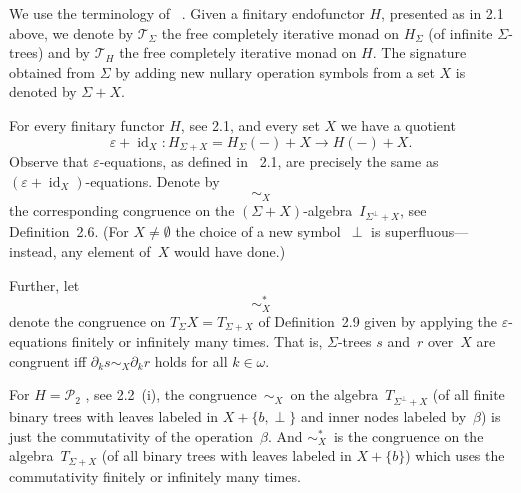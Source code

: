 \documentclass{entcs}
\newcommand{\simx}{\ensuremath{\mathrel{\sim_X}}}
\newcommand{\simxs}{\ensuremath{\mathrel{\sim_X^*}}}
\newcommand{\PP}{\ensuremath{\mathscr{P}}}
\newcommand{\TT}{\ensuremath{\mathscr{T}}}
\DeclareMathOperator{\id}{id}
\newenvironment{pv}[1]{\begin{trivlist}
\item[\hspace{\labelsep}\normalfont\bfseries#1]}%
{\end{trivlist}}
\begin{document}
\begin{pv}{3.1}
We use the terminology of ~\cite{aamv}. Given a finitary endofunctor $H$,
presented as in 2.1 above, we denote by $\TT_\Sigma$ the free completely iterative monad on $H_\Sigma$ (of infinite $\Sigma$-trees) and by $\TT_H$ the free completely iterative monad on $H$. The signature obtained from $\Sigma$ by adding new nullary
operation symbols from a set $X$ is denoted by $\Sigma+X$.
\end{pv}

\begin{pv}{3.2 Remark}
For every finitary functor $H$, see 2.1, and every set $X$ we have a quotient
\[\varepsilon+\id_X\colon H_{\Sigma+X}=H_\Sigma({-})+X\to
H({-})+X.\]
Observe that $\varepsilon$-equations, as defined in
~2.1, are precisely the same as
$(\varepsilon+\id_X)$-equations. Denote by
\[\simx\]
the corresponding congruence on the
$(\Sigma+X)$-algebra~$I_{\Sigma^\perp+X}$, see Definition~2.6.
(For $X\neq\emptyset$ the choice of a new
symbol~$\perp$ is superfluous---instead, any element of~$X$ would
have done.)

Further, let
\[\simxs\]
denote the congruence on $T_\Sigma X=T_{\Sigma+X}$ of
Definition~2.9 given by applying the $\varepsilon$-equations
finitely or infinitely many times. That is, $\Sigma$-trees
$s$ and~$r$ over~$X$
are congruent iff $\partial_ks\simx\partial_kr$ holds
for all $k\in\omega$.
\end{pv}

\begin{pv}{3.3 Example}
For $H=\PP_{\!2}$ , see 2.2~(i), the congruence~\simx\ on
the algebra~$T_{\Sigma^\perp+X}$ (of all finite binary trees with
leaves labeled in $X+\{b,\perp\}$ and inner nodes labeled by~$\beta$)
is just the commutativity of the operation~$\beta$. And \simxs~is
the congruence on the algebra~$T_{\Sigma+X}$ (of all binary trees
with leaves labeled in $X+\{b\}$) which uses the commutativity
finitely or infinitely many times.
%
\end{pv}
\end{document}
